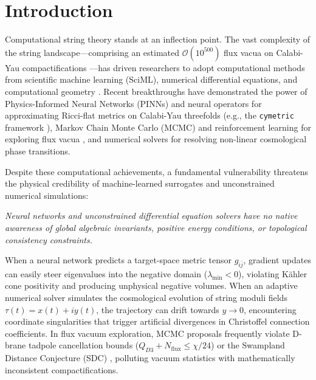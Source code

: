 \documentclass[11pt,a4paper]{article}
\begin{document}
\newpage
\tableofcontents
\newpage

\section{Introduction}
\label{sec:introduction}

Computational string theory stands at an inflection point. The vast complexity of the string landscape---comprising an estimated $\mathcal{O}(10^{500})$ flux vacua on Calabi-Yau compactifications \cite{douglas2003}---has driven researchers to adopt computational methods from scientific machine learning (SciML), numerical differential equations, and computational geometry \cite{he2017deep,ruehle2020data}. Recent breakthroughs have demonstrated the power of Physics-Informed Neural Networks (PINNs) and neural operators for approximating Ricci-flat metrics on Calabi-Yau threefolds (e.g., the \texttt{cymetric} framework \cite{anderson2021cymetric,larfors2022numerical}), Markov Chain Monte Carlo (MCMC) and reinforcement learning for exploring flux vacua \cite{halverson2019branes}, and numerical solvers for resolving non-linear cosmological phase transitions.

Despite these computational achievements, a fundamental vulnerability threatens the physical credibility of machine-learned surrogates and unconstrained numerical simulations:
\begin{center}
\emph{Neural networks and unconstrained differential equation solvers have no native awareness of global algebraic invariants, positive energy conditions, or topological consistency constraints.}
\end{center}

When a neural network predicts a target-space metric tensor $g_{i\bar{j}}$, gradient updates can easily steer eigenvalues into the negative domain ($\lambda_{\min} < 0$), violating Kähler cone positivity and producing unphysical negative volumes. When an adaptive numerical solver simulates the cosmological evolution of string moduli fields $\tau(t) = x(t) + i y(t)$, the trajectory can drift towards $y \to 0$, encountering coordinate singularities that trigger artificial divergences in Christoffel connection coefficients. In flux vacuum exploration, MCMC proposals frequently violate D-brane tadpole cancellation bounds ($Q_{D3} + N_{\text{flux}} \le \chi/24$) or the Swampland Distance Conjecture (SDC) \cite{ooguri2006}, polluting vacuum statistics with mathematically inconsistent compactifications.
\end{document}
